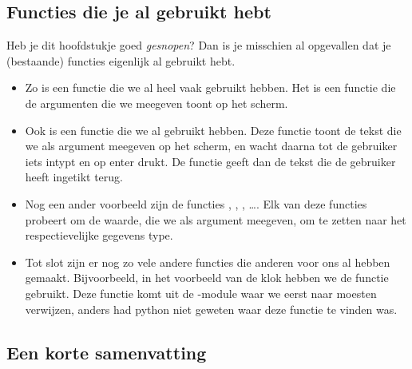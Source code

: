 \subsection{Functies die je al gebruikt hebt}

Heb je dit hoofdstukje goed \textit{gesnopen}?
Dan is je misschien al opgevallen dat je (bestaande) functies eigenlijk al gebruikt hebt.
\begin{itemize}
	\item
		Zo is  een functie die we al heel vaak gebruikt hebben.
		Het is een functie die de argumenten die we meegeven toont op het scherm.
	\item
		Ook  is een functie die we al gebruikt hebben.
		Deze functie toont de tekst die we als argument meegeven op het scherm,
		en wacht daarna tot de gebruiker iets intypt en op enter drukt.
		De functie geeft dan de tekst die de gebruiker heeft ingetikt terug.
	\item
		Nog een ander voorbeeld zijn de functies , , , \dots .
		Elk van deze functies probeert om de waarde, die we als argument meegeven, om te zetten naar het respectievelijke gegevens type.
	\item
		Tot slot zijn er nog zo vele andere functies die anderen voor ons al hebben gemaakt.
		Bijvoorbeeld, in het voorbeeld van de klok hebben we de functie  gebruikt.
		Deze functie komt uit de -module waar we eerst naar moesten verwijzen,
		anders had python niet geweten waar deze functie te vinden was.
\end{itemize}

\subsection{Een korte samenvatting}


